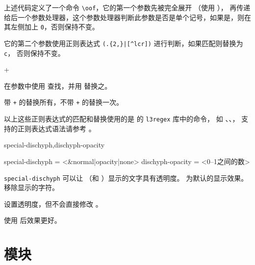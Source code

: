 \documentclass{whudoc}
\begin{document}
上述代码定义了一个命令 \verb|\oof|，它的第一个参数先被完全展开
（使用 ），
再传递给后一个参数处理器，这个参数处理器判断此参数是否是单个记号，如果是，则在其左侧加上 
\verb|0|，否则保持不变。

它的第二个参数使用正则表达式 \verb!(.{2,}|[^lcr])! 进行判断，如果匹配则替换为 \verb|c|，
否则保持不变。

\begin{function}{\RegexReplaceArgument}
  \begin{syntax}
    \V\RegexReplaceArgument   {} 
    \V\RegexReplaceArgument +  
  \end{syntax}
在参数中使用  查找，并用  替换之。

带 \texttt{+} 的替换所有，不带 \texttt{+} 的替换一次。
\end{function}


\begin{texnote}
以上这些正则表达式的匹配和替换使用的是 \LaTeXiii 的 \texttt{l3regex} 库中的命令，
如 、、，
支持的正则表达式语法请参考 。
\end{texnote}

\begin{keyval}[path=typo]{special-dischyph,dischyph-opacity}
  \begin{syntax}
    special-dischyph = <&normal|opacity|none>
    dischyph-opacity = <{0--1之间的数}>
  \end{syntax}
\verb|special-dischyph| 可以让 \tn{-} （和 ）显示的文字具有透明度。
 为默认的显示效果。 移除显示的字符。

 设置透明度，但不会直接修改 。

使用  后效果更好。
\end{keyval}


\section{模块}
\end{document}
